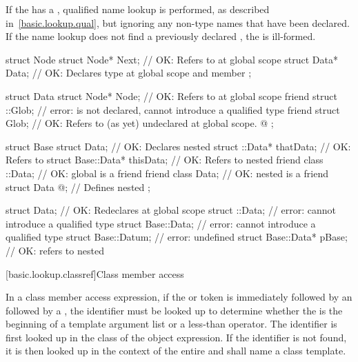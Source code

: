 \pnum
If the  has a
, qualified name lookup is performed, as
described in~\ref{basic.lookup.qual}, but ignoring any non-type names
that have been declared. If the name lookup does not find a previously
declared , the 
is ill-formed. \begin{example}

\begin{codeblock}
struct Node {
  struct Node* Next;            // OK: Refers to  at global scope
  struct Data* Data;            // OK: Declares type  at global scope and member 
};

struct Data {
  struct Node* Node;            // OK: Refers to  at global scope
  friend struct ::Glob;         // error:  is not declared, cannot introduce a qualified type
  friend struct Glob;           // OK: Refers to (as yet) undeclared  at global scope.
  @\commentellip@
};

struct Base {
  struct Data;                  // OK: Declares nested 
  struct ::Data*     thatData;  // OK: Refers to 
  struct Base::Data* thisData;  // OK: Refers to nested 
  friend class ::Data;          // OK: global  is a friend
  friend class Data;            // OK: nested  is a friend
  struct Data { @\commentellip@ };    // Defines nested 
};

struct Data;                    // OK: Redeclares  at global scope
struct ::Data;                  // error: cannot introduce a qualified type
struct Base::Data;              // error: cannot introduce a qualified type
struct Base::Datum;             // error:  undefined
struct Base::Data* pBase;       // OK: refers to nested 
\end{codeblock}
\end{example} %
%

[basic.lookup.classref]{Class member access}

\pnum
{}%
In a class member access expression, if the 
or \tcode{->} token is immediately followed by an 
followed by a \tcode{<}, the identifier must be looked up to determine
whether the \tcode{<} is the beginning of a template argument
list or a less-than operator. The identifier is first
looked up in the class of the object expression. If the identifier is
not found, it is then looked up in the context of the entire
 and shall name a class template.

